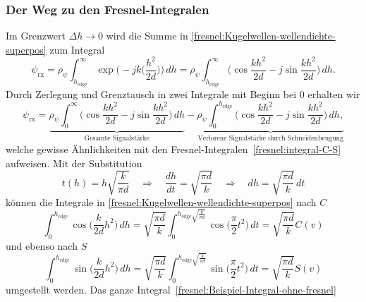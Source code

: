 \subsubsection{Der Weg zu den Fresnel-Integralen}
Im Grenzwert $\Delta h\to 0$ wird die Summe in 
\eqref{fresnel:Kugelwellen-wellendichte-superpos}
zum Integral
\begin{equation}
    \psi_{\text{rx}}
    =
    \rho_{\psi} \int_{h_{\text{edge}}}^{\infty} \exp\biggl(-jk\biggl(\frac{h^2}{2d}\biggr)\biggr) \,dh
    =
    \rho_{\psi} \int_{h_{\text{edge}}}^{\infty} \biggl(\cos \frac{kh^2}{2d} - j \sin \frac{kh^2}{2d}\biggr) \,dh.
    \label{fresnel:Kugelwellen-wellendichte-integral}
\end{equation}
Durch Zerlegung und Grenztausch in zwei Integrale mit Beginn bei 0
erhalten wir
\begin{equation}
    \psi_{\text{rx}}
    =
    \underbrace{\rho_{\psi} \int_{0}^{\infty} \biggl(\cos \frac{kh^2}{2d} - j \sin \frac{kh^2}{2d}\biggr) \,dh}_{\text{Gesamte Signalstärke}}
    -
    \underbrace{\rho_{\psi} \int_{0}^{h_{\text{edge}}} \biggl(\cos \frac{kh^2}{2d} - j \sin \frac{kh^2}{2d}\biggr) \,dh,}_{\text{Verlorene Signalstärke durch Schneidenbeugung}}
    \label{fresnel:Beispiel-Integral-ohne-fresnel}
\end{equation}
welche gewisse Ähnlichkeiten mit den 
Fresnel-Integralen~\eqref{fresnel:integral-C-S} aufweisen.
Mit der Substitution%
\[
t(h)
=
h\sqrt{\frac{k}{\pi d}}
\quad
\Rightarrow
\quad
\frac{dh}{dt}
=
\sqrt{\frac{\pi d}{k}}
\quad
\Rightarrow
\quad
dh
=
\sqrt{\frac{\pi d}{k}} \,dt
\]
können die Integrale in
\eqref{fresnel:Kugelwellen-wellendichte-superpos}
nach $C$
\begin{equation*}
    \int_{0}^{h_{\text{edge}}} \cos \biggl(\frac{k}{2d}h^2\biggr) \,dh
    =
    \sqrt{\frac{\pi d}{k}} \int_{0}^{h_{\text{edge}}\sqrt{\frac{k}{\pi d}}} \cos \biggl(\frac{\pi}{2}t^2\biggr) \,dt
    =
    \sqrt{\frac{\pi d}{k}} C(v)
\end{equation*}
und ebenso nach $S$
\begin{equation*}
    \int_{0}^{h_{\text{edge}}} \sin \biggl(\frac{k}{2d}h^2\biggr) \,dh
    =
    \sqrt{\frac{\pi d}{k}} \int_{0}^{h_{\text{edge}}\sqrt{\frac{k}{\pi d}}} \sin \biggl(\frac{\pi}{2}t^2\biggr) \,dt
    =
    \sqrt{\frac{\pi d}{k}} S(v)
\end{equation*}
umgestellt werden.
Das ganze Integral~\eqref{fresnel:Beispiel-Integral-ohne-fresnel}
